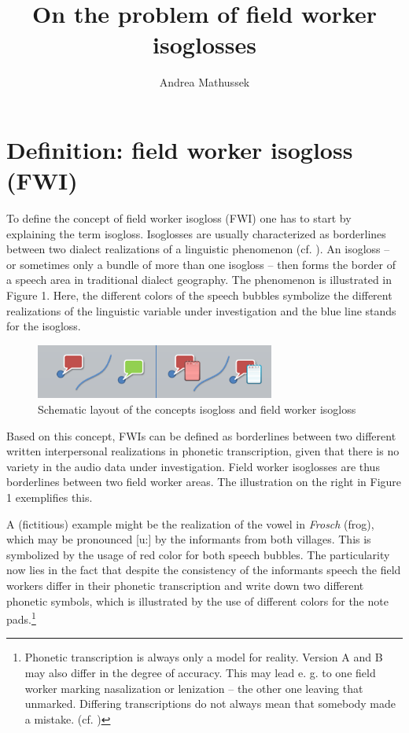 \documentclass[output=paper]{LSP/langsci}
\author{Andrea Mathussek\affiliation{Albert-Ludwigs-University Freiburg}}
\title{On the problem of field worker isoglosses}
\begin{document}
% 
% 
% 

\section{Definition: field worker isogloss (FWI)}
To define the concept of {\textquotedbl}field worker isogloss{\textquotedbl} (FWI) one has to start by explaining the term {\textquotedbl}isogloss{\textquotedbl}. Isoglosses are usually characterized as borderlines between two dialect realizations of a linguistic phenomenon (cf. \citealt[296--297]{gluck_metzler_2005}). An isogloss – or sometimes only a bundle of more than one isogloss – then forms the border of a speech area in traditional dialect geography. The phenomenon is illustrated in Figure 1. Here, the different colors of the speech bubbles symbolize the different realizations of the linguistic variable under investigation and the blue line stands for the isogloss.

\begin{figure}
\includegraphics[width=0.7\textwidth]{illustrations/mathus_fig1}
\caption{Schematic layout of the concepts {\textquotedbl}isogloss{\textquotedbl} and {\textquotedbl}field worker isogloss{\textquotedbl}}
\label{fig:1}
\end{figure}

Based on this concept, FWIs can be defined as borderlines between two different written interpersonal realizations in phonetic transcription, given that there is no variety in the audio data under investigation. Field worker isoglosses are thus borderlines between two field worker areas. The illustration on the right in Figure 1 exemplifies this.

A (fictitious) example might be the realization of the vowel in \textit{Frosch} ({\textquotesingle}frog{\textquotesingle}), which may be pronounced [u:] by the informants from both villages. This is symbolized by the usage of red color for both speech bubbles. The particularity now lies in the fact that despite the consistency of the informants{\textquotesingle} speech the field workers differ in their phonetic transcription and write down two different phonetic symbols, which is illustrated by the use of different colors for the note pads.\footnote{Phonetic transcription is always only a model for reality. Version A and B may also differ in the degree of accuracy. This may lead e. g. to one field worker marking nasalization or lenization – the other one leaving that unmarked. Differing transcriptions do not always mean that somebody made a mistake. (cf. \citealt[41--69]{mathussek_sprachraume_2014})}
\end{document}
